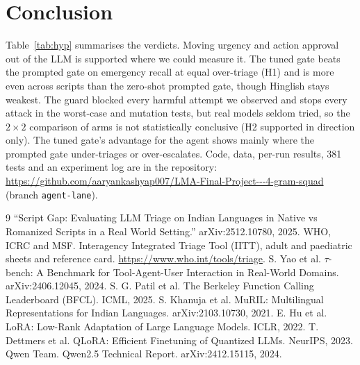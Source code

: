 \documentclass[10pt,a4paper]{article}
\begin{document}
\section{Conclusion}
Table~\ref{tab:hyp} summarises the verdicts. Moving urgency and action approval out of the LLM is supported where we could measure it. The tuned gate beats the prompted gate on emergency recall at equal over-triage (H1) and is more even across scripts than the zero-shot prompted gate, though Hinglish stays weakest. The guard blocked every harmful attempt we observed and stops every attack in the worst-case and mutation tests, but real models seldom tried, so the $2\times2$ comparison of arms is not statistically conclusive (H2 supported in direction only). The tuned gate's advantage for the agent shows mainly where the prompted gate under-triages or over-escalates. Code, data, per-run results, 381 tests and an experiment log are in the repository: \url{https://github.com/aaryankashyap007/LMA-Final-Project---4-gram-squad} (branch \texttt{agent-lane}).

\begin{thebibliography}{9}\small
{} ``Script Gap: Evaluating LLM Triage on Indian Languages in Native vs Romanized Scripts in a Real World Setting.'' arXiv:2512.10780, 2025.
 WHO, ICRC and MSF. Interagency Integrated Triage Tool (IITT), adult and paediatric sheets and reference card. \url{https://www.who.int/tools/triage}.
 S. Yao et al. $\tau$-bench: A Benchmark for Tool-Agent-User Interaction in Real-World Domains. arXiv:2406.12045, 2024.
 S. G. Patil et al. The Berkeley Function Calling Leaderboard (BFCL). ICML, 2025.
 S. Khanuja et al. MuRIL: Multilingual Representations for Indian Languages. arXiv:2103.10730, 2021.
 E. Hu et al. LoRA: Low-Rank Adaptation of Large Language Models. ICLR, 2022.
 T. Dettmers et al. QLoRA: Efficient Finetuning of Quantized LLMs. NeurIPS, 2023.
 Qwen Team. Qwen2.5 Technical Report. arXiv:2412.15115, 2024.
\end{thebibliography}
\end{document}

